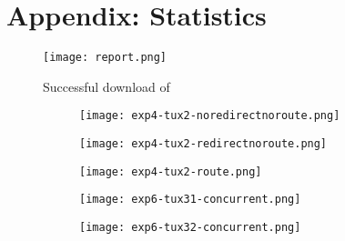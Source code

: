 \documentclass[compilation.tex]{subfiles}
\begin{document}
\clearpage
\section{Appendix: Statistics}
\label{sec:statistics}

\begin{figure}[htbp]
\centering
\texttt{[image: report.png]}
\caption{Successful download of }
\label{fig:download}
\end{figure}

\begin{figure}[hbtp]
\centering
\caption{ pings , seen from }
\begin{subfigure}[hbtp]{\textwidth}
	\centering
	\texttt{[image: exp4-tux2-noredirectnoroute.png]}
	\vspace*{.8\baselineskip}
\end{subfigure}
\begin{subfigure}[hbtp]{\textwidth}
	\centering
	\texttt{[image: exp4-tux2-redirectnoroute.png]}
	\vspace*{.8\baselineskip}
\end{subfigure}
\begin{subfigure}[hbtp]{\textwidth}
	\centering
	\texttt{[image: exp4-tux2-route.png]}
	\vspace*{.8\baselineskip}
\end{subfigure}
\label{fig:exp4-tux2.png}
\end{figure}

\begin{figure}[hbtp]
\centering
\caption{Throughputs of concurrent download of 310 MB file in  and .}
\begin{subfigure}[hbtp]{\textwidth}
	\centering
	\texttt{[image: exp6-tux31-concurrent.png]}
	\vspace*{.8\baselineskip}
\end{subfigure}
\begin{subfigure}[hbtp]{\textwidth}
	\centering
	\texttt{[image: exp6-tux32-concurrent.png]}
	\vspace*{.8\baselineskip}
\end{subfigure}
\label{fig:exp6-throughput}
\end{figure}
\end{document}
